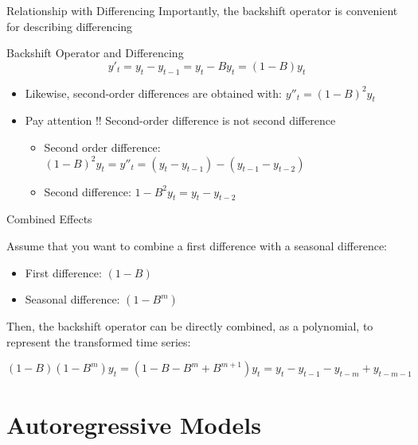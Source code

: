 \documentclass{beamer}
\begin{document}
\begin{frame}{Relationship with Differencing}
  Importantly, the backshift operator is convenient for describing differencing\\

  \medskip
  
  \begin{exampleblock}{Backshift Operator and Differencing}
    $$y'_t = y_t - y_{t-1} = y_t - By_t = (1-B)y_t$$
  \end{exampleblock}


  \begin{itemize}
    \item Likewise, second-order differences are obtained with: $y''_t = (1-B)^2y_t$  
    \item Pay attention !! Second-order difference is not second difference 
      \begin{itemize}
      \item Second order difference: $(1-B)^2 y_t = y''_t = (y_t - y_{t-1}) - (y_{t-1} - y_{t-2})$
      \item Second difference: $1-B^2 y_t = y_t - y_{t-2}$
      \end{itemize}
  \end{itemize}
  
\end{frame}


\begin{frame}{Combined Effects}

Assume that you want to combine a first difference with a seasonal difference:
  
  \begin{itemize}
  \item First difference: $(1-B)$
  \item Seasonal difference: $(1-B^m)$
  \end{itemize}

  Then, the backshift operator can be directly combined, as a polynomial, to represent the transformed time series:

  \begin{equation*}
    (1-B)(1-B^m)y_t = (1 - B - B^m + B^{m+1})y_t = y_t - y_{t-1} - y_{t-m} + y_{t-m-1}
  \end{equation*}    
\end{frame}


\section{Autoregressive Models}
\end{document}
